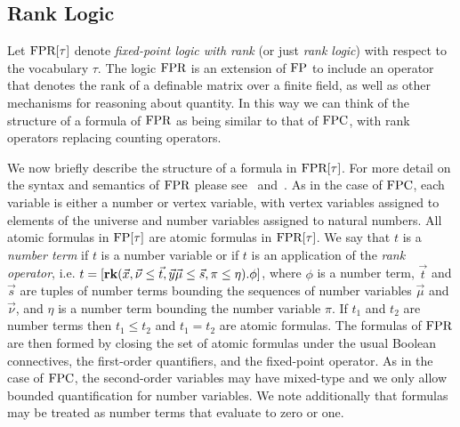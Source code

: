 \documentclass[../paper.tex]{subfiles}
\begin{document}

\subsection{Rank Logic}
Let $\text{\upshape FPR}[\tau]$ denote \emph{fixed-point logic with rank} (or just \emph{rank
  logic}) with respect to the vocabulary $\tau$. The logic $\text{\upshape FPR}$ is an
extension of $\text{\upshape FP}$ to include an operator that denotes the rank of a definable
matrix over a finite field, as well as other mechanisms for reasoning about
quantity. In this way we can think of the structure of a formula of $\text{\upshape FPR}$ as
being similar to that of $\text{\upshape FPC}$, with rank operators replacing counting
operators.

We now briefly describe the structure of a formula in $\text{\upshape FPR}[\tau]$. For more
detail on the syntax and semantics of $\text{\upshape FPR}$ please see~\cite{GradelP15a}
and~\cite{Dawar09logicswith}. As in the case of $\text{\upshape FPC}$, each variable is either
a number or vertex variable, with vertex variables assigned to elements of the
universe and number variables assigned to natural numbers. All atomic formulas
in $\text{\upshape FP}[\tau]$ are atomic formulas in $\text{\upshape FPR}[\tau]$. We say that $t$ is a
\emph{number term} if $t$ is a number variable or if $t$ is an application of
the \emph{rank operator}, i.e. $t = [\text{\textbf{rk}} (\vec{x}, \vec {\nu} \leq \vec{t},
\vec{y}\vec{\mu} \leq \vec{s}, \pi \leq \eta). \phi]$, where $\phi$ is a number
term, $\vec{t}$ and $\vec{s}$ are tuples of number terms bounding the sequences
of number variables $\vec{\mu}$ and $\vec{\nu}$, and $\eta$ is a number term
bounding the number variable $\pi$. If $t_1$ and $t_2$ are number terms then
$t_1 \leq t_2$ and $t_1 = t_2$ are atomic formulas. The formulas of $\text{\upshape FPR}$ are
then formed by closing the set of atomic formulas under the usual Boolean
connectives, the first-order quantifiers, and the fixed-point operator. As in
the case of $\text{\upshape FPC}$, the second-order variables may have mixed-type and we only
allow bounded quantification for number variables. We note additionally that
formulas may be treated as number terms that evaluate to zero or one.
\end{document}
